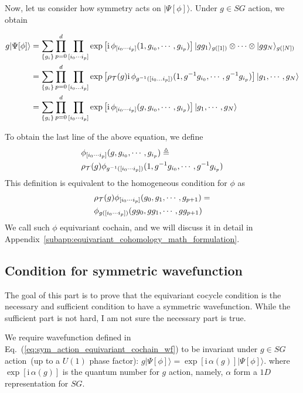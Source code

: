 \documentclass[reprint,amsmath,amssymb,aps,pra,]{revtex4-1}
\newcommand{\ii}{\mathrm{i}\,} %
\newcommand{\TT}{\mathcal{T}} %
\begin{document}
Now, let us consider how symmetry acts on $|\Psi[\phi]\rangle$.
Under $g\in SG$ action, we obtain
\begin{widetext}
  \begin{align}
    g|\Psi[\phi]\rangle&=\sum_{\{g_i\}}\prod_{p=0}^d \prod_{[i_0\cdots i_{p}]} \exp\left[ \ii \phi_{[i_0\cdots i_{p}]}(1,g_{i_0},\cdots,g_{i_{p}}) \right] |gg_1\rangle_{g([1])}\otimes\cdots\otimes|gg_N\rangle_{g([N])}\notag\\
    &=\sum_{\{g_i\}}\prod_{p=0}^d \prod_{[i_0\ldots i_{p}]} \exp\left[ \rho_{\TT}(g)\ii \phi_{g^{-1}([i_0\ldots i_{p}])}(1,g^{-1}g_{i_0},\cdots,g^{-1}g_{i_{p}}) \right] |g_1,\cdots,g_N\rangle\notag\\
    &=\sum_{\{g_i\}}\prod_{p=0}^d \prod_{[i_0\cdots i_{p}]} \exp\left[ \ii \phi_{[i_0\cdots i_{p}]}(g,g_{i_0},\cdots,g_{i_{p}}) \right] |g_1,\cdots,g_N\rangle
    \label{eq:sym_action_equivariant_cochain_wf}
  \end{align}
\end{widetext}
To obtain the last line of the above equation, we define
\begin{align}
  &\phi_{[i_0\cdots i_{p}]}(g,g_{i_0},\cdots,g_{i_{p}})\triangleq\notag\\
  &\rho_{\TT}(g) \phi_{g^{-1}([i_0\cdots i_{p}])}(1,g^{-1}g_{i_0},\cdots,g^{-1}g_{i_{p}})
  \label{}
\end{align}
This definition is equivalent to the homogeneous condition for $\phi$ as
\begin{align}
  &\rho_{\TT}(g)\phi_{[i_0\cdots i_{p}]}(g_0,g_1,\cdots,g_{p+1})=\notag\\
  &\phi_{g([i_0\cdots i_{p}])}(gg_0,gg_1,\cdots,gg_{p+1})
  \label{eq:equivariant_cochain_condition}
\end{align}
We call such $\phi$ equivariant cochain, and we will discuss it in detail in Appendix~\ref{subapp:equivariant_cohomology_math_formulation}.

\subsection{Condition for symmetric wavefunction}
{\color{red} The goal of this part is to prove that the equivariant cocycle condition is the necessary and sufficient condition to have a symmetric wavefunction. While the sufficient part is not hard, I am not sure the necessary part is true.}

We require wavefunction defined in Eq.~(\ref{eq:sym_action_equivariant_cochain_wf}) to be invariant under $g\in SG$ action~(up to a $U(1)$ phase factor): $g|\Psi[\phi]\rangle=\exp[\ii \alpha(g)]|\Psi[\phi]\rangle$. 
where $\exp[\ii\alpha(g)]$ is the quantum number for $g$ action, namely, $\alpha$ form a $1D$ representation for $SG$.
\end{document}
